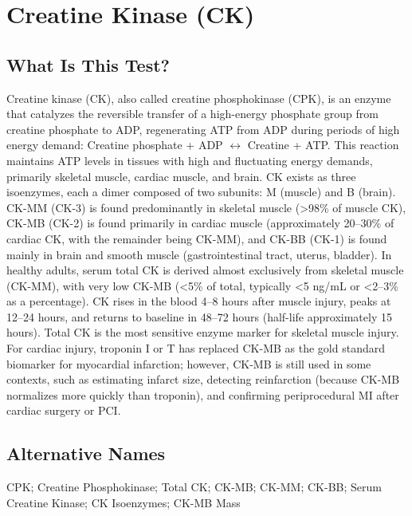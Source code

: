 \chapter{Creatine Kinase (CK)}

\section*{What Is This Test?}
Creatine kinase (CK), also called creatine phosphokinase (CPK), is an enzyme that catalyzes the reversible transfer of a high-energy phosphate group from creatine phosphate to ADP, regenerating ATP from ADP during periods of high energy demand: Creatine phosphate + ADP $\leftrightarrow$ Creatine + ATP. This reaction maintains ATP levels in tissues with high and fluctuating energy demands, primarily skeletal muscle, cardiac muscle, and brain. CK exists as three isoenzymes, each a dimer composed of two subunits: M (muscle) and B (brain). CK-MM (CK-3) is found predominantly in skeletal muscle (>98\% of muscle CK), CK-MB (CK-2) is found primarily in cardiac muscle (approximately 20--30\% of cardiac CK, with the remainder being CK-MM), and CK-BB (CK-1) is found mainly in brain and smooth muscle (gastrointestinal tract, uterus, bladder). In healthy adults, serum total CK is derived almost exclusively from skeletal muscle (CK-MM), with very low CK-MB (<5\% of total, typically <5 ng/mL or <2--3\% as a percentage). CK rises in the blood 4--8 hours after muscle injury, peaks at 12--24 hours, and returns to baseline in 48--72 hours (half-life approximately 15 hours). Total CK is the most sensitive enzyme marker for skeletal muscle injury. For cardiac injury, troponin I or T has replaced CK-MB as the gold standard biomarker for myocardial infarction; however, CK-MB is still used in some contexts, such as estimating infarct size, detecting reinfarction (because CK-MB normalizes more quickly than troponin), and confirming periprocedural MI after cardiac surgery or PCI.

\section*{Alternative Names}
CPK; Creatine Phosphokinase; Total CK; CK-MB; CK-MM; CK-BB; Serum Creatine Kinase; CK Isoenzymes; CK-MB Mass

